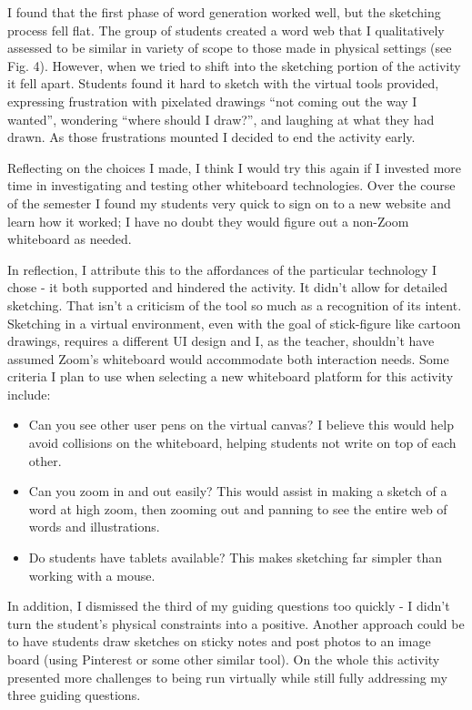 \documentclass[journal]{vgtc}                %
\begin{document}
I found that the first phase of word generation worked well, but the sketching process fell flat. The group of students created a word web that I qualitatively assessed to be similar in variety of scope to those made in physical settings (see Fig. 4).  However, when we tried to shift into the sketching portion of the activity it fell apart. Students found it hard to sketch with the virtual tools provided, expressing frustration with pixelated drawings “not coming out the way I wanted”, wondering “where should I draw?”, and laughing at what they had drawn. As those frustrations mounted I decided to end the activity early. 

Reflecting on the choices I made, I think I would try this again if I invested more time in investigating and testing other whiteboard technologies. Over the course of the semester I found my students very quick to sign on to a new website and learn how it worked; I have no doubt they would figure out a non-Zoom whiteboard as needed. 

In reflection, I attribute this to the affordances of the particular technology I chose - it both supported and hindered the activity. It didn't allow for detailed sketching. That isn’t a criticism of the tool so much as a recognition of its intent. Sketching in a virtual environment, even with the goal of stick-figure like cartoon drawings, requires a different UI design and I, as the teacher, shouldn’t have assumed Zoom’s whiteboard would accommodate both interaction needs. Some criteria I plan to use when selecting a new whiteboard platform for this activity include:

\begin{itemize}
  \itemsep0em 
  \item Can you see other user pens on the virtual canvas? I believe this would help avoid collisions on the whiteboard, helping students not write on top of each other.
  \item Can you zoom in and out easily? This would assist in making a sketch of a word at high zoom, then zooming out and panning to see the entire web of words and illustrations.
  \item Do students have tablets available? This makes sketching far simpler than working with a mouse.
\end{itemize}

In addition, I dismissed the third of my guiding questions too quickly - I didn't turn the student's physical constraints into a positive. Another approach could be to have students draw sketches on sticky notes and post photos to an image board (using Pinterest or some other similar tool). On the whole this activity presented more challenges to being run virtually while still fully addressing my three guiding questions.
\end{document}
